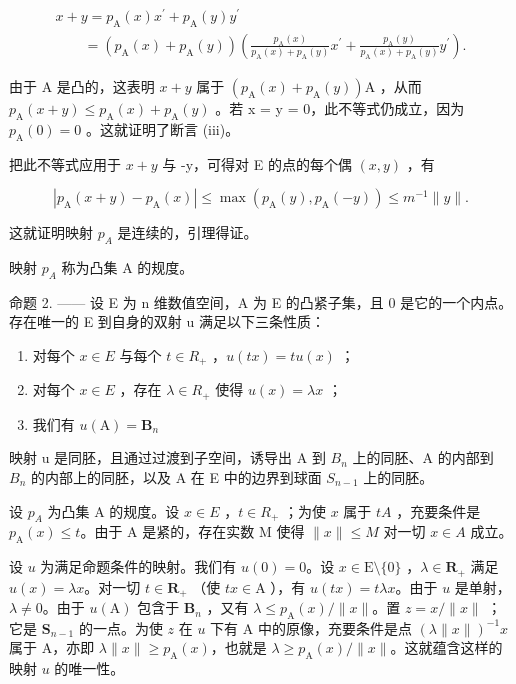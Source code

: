 \[
\begin{array}{l} x + y = p _ {\mathrm{A}} (x) x ^ {\prime} + p _ {\mathrm{A}} (y) y ^ {\prime} \\ \qquad = (p _ {\mathrm{A}} (x) + p _ {\mathrm{A}} (y)) \left(\frac {p _ {\mathrm{A}} (x)}{p _ {\mathrm{A}} (x) + p _ {\mathrm{A}} (y)} x ^ {\prime} + \frac {p _ {\mathrm{A}} (y)}{p _ {\mathrm{A}} (x) + p _ {\mathrm{A}} (y)} y ^ {\prime}\right). \end{array}
\]

由于 A 是凸的，这表明 \(x + y\) 属于 \((p_{\mathrm{A}}(x) + p_{\mathrm{A}}(y))\mathrm{A}\) ，从而 \(p_{\mathrm{A}}(x + y) \leqslant p_{\mathrm{A}}(x) + p_{\mathrm{A}}(y)\) 。若 x = y = 0，此不等式仍成立，因为 \(p_{\mathrm{A}}(0) = 0\) 。这就证明了断言 (iii)。

把此不等式应用于 \(x + y\) 与 -y，可得对 E 的点的每个偶 \((x, y)\) ，有

\[
| p _ {\mathrm{A}} (x + y) - p _ {\mathrm{A}} (x) | \leqslant \max (p _ {\mathrm{A}} (y), p _ {\mathrm{A}} (- y)) \leqslant m ^ {- 1} \| y \|.
\]

这就证明映射 \(p_{A}\) 是连续的，引理得证。

映射 \(p_{A}\) 称为凸集 A 的规度。

命题 2. —— 设 E 为 n 维数值空间，A 为 E 的凸紧子集，且 0 是它的一个内点。存在唯一的 E 到自身的双射 u 满足以下三条性质：

\begin{enumerate}
\def\labelenumi{(\roman{enumi})}
\item
  对每个 \(x \in E\) 与每个 \(t \in R_{+}\) ，\(u(tx) = tu(x)\) ；
\item
  对每个 \(x \in E\) ，存在 \(\lambda \in R_{+}\) 使得 \(u(x) = \lambda x\) ；
\item
  我们有 \(u(\mathrm{A}) = \mathbf{B}_n\)
\end{enumerate}

映射 u 是同胚，且通过过渡到子空间，诱导出 A 到 \(B_{n}\) 上的同胚、A 的内部到 \(B_{n}\) 的内部上的同胚，以及 A 在 E 中的边界到球面 \(S_{n-1}\) 上的同胚。

设 \(p_{A}\) 为凸集 A 的规度。设 \(x \in E\) ，\(t \in R_{+}\) ；为使 \(x\) 属于 \(tA\) ，充要条件是 \(p_{\mathrm{A}}(x) \leqslant t\)。由于 A 是紧的，存在实数 M 使得 \(\|x\| \leqslant M\) 对一切 \(x \in A\) 成立。

设 \(u\) 为满足命题条件的映射。我们有 \(u(0) = 0\)。设 \(x \in \mathrm{E}\setminus\{0\}\) ，\(\lambda \in \mathbf{R}_+\) 满足 \(u(x) = \lambda x\)。对一切 \(t \in \mathbf{R}_+\) （使 \(tx \in \mathrm{A}\) ），有 \(u(tx) = t\lambda x\)。由于 \(u\) 是单射，\(\lambda \neq 0\)。由于 \(u(\mathrm{A})\) 包含于 \(\mathbf{B}_n\) ，又有 \(\lambda \leqslant p_{\mathrm{A}}(x)/\|x\|\)。置 \(z = x/\|x\|\) ；它是 \(\mathbf{S}_{n-1}\) 的一点。为使 \(z\) 在 \(u\) 下有 A 中的原像，充要条件是点 \((\lambda \|x\|)^{-1}x\) 属于 A，亦即 \(\lambda \|x\| \geqslant p_{\mathrm{A}}(x)\)，也就是 \(\lambda \geqslant p_{\mathrm{A}}(x)/\|x\|\)。这就蕴含这样的映射 \(u\) 的唯一性。

